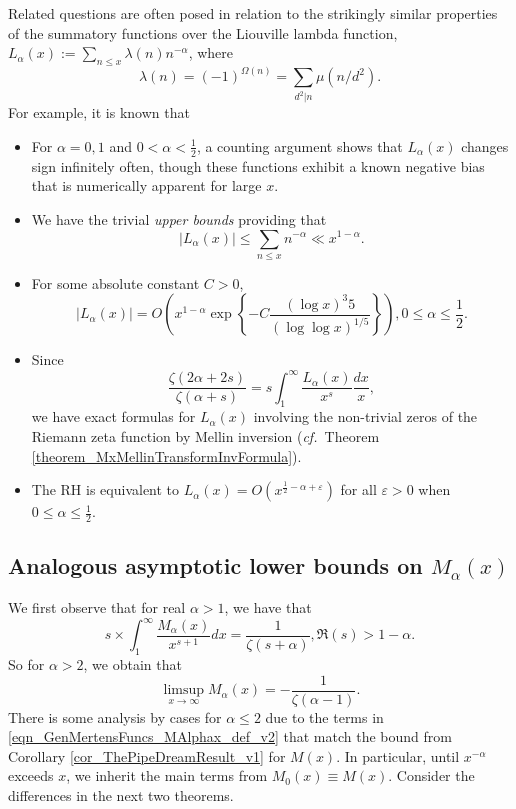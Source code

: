 \documentclass[11pt,reqno,a4letter]{article}
\numberwithin{figure}{section}
\numberwithin{table}{section}
\newcommand{\cf}{\textit{cf.\ }}
\newcommand{\floor}[1]{\left\lfloor #1 \right\rfloor}
\theoremstyle{plain}
\numberwithin{theorem}{section}
\theoremstyle{definition}
\begin{document}
Related questions are often posed in relation to the strikingly 
similar properties of the 
summatory functions over the Liouville lambda function, 
$L_{\alpha}(x) := \sum_{n \leq x} \lambda(n) n^{-\alpha}$, where 
$$\lambda(n) = (-1)^{\Omega(n)} = \sum_{d^2|n} \mu(n/d^2).$$  
For example, it is known that \cite{JNT-HUMPHRIES-2013} 
\begin{itemize} 
     \item For $\alpha = 0, 1$ and $0 < \alpha < \frac{1}{2}$, a counting argument shows that 
     $L_{\alpha}(x)$ changes sign infinitely often, though these functions exhibit a known 
     negative bias that is numerically apparent for large $x$. 
     \item We have the trivial \emph{upper bounds} providing that 
     \[
     |L_{\alpha}(x)| \leq \sum_{n \leq x} n^{-\alpha} \ll x^{1-\alpha}. 
     \]
     \item For some absolute constant $C > 0$, 
     \[
     |L_{\alpha}(x)| = O\left(x^{1-\alpha} \exp\left\{-C \frac{(\log x)^{3}{5}}{(\log\log x)^{1/5}} 
          \right\}\right), 0 \leq \alpha \leq \frac{1}{2}. 
     \]
     \item Since 
     \[
     \frac{\zeta(2\alpha+2s)}{\zeta(\alpha+s)} = s \int_1^{\infty} \frac{L_{\alpha}(x)}{x^s} \frac{dx}{x}, 
     \]
     we have exact formulas for $L_{\alpha}(x)$ involving the non-trivial zeros of the 
     Riemann zeta function by Mellin inversion (\cf Theorem \ref{theorem_MxMellinTransformInvFormula}).  
     \item The RH is equivalent to $L_{\alpha}(x) = O(x^{\frac{1}{2}-\alpha+\varepsilon})$ for all 
           $\varepsilon > 0$ when $0 \leq \alpha \leq \frac{1}{2}$. 
\end{itemize} 

\subsection{Analogous asymptotic lower bounds on $M_{\alpha}(x)$} 

We first observe that for real $\alpha > 1$, we have that 
\[
s \times \int_1^{\infty} \frac{M_{\alpha}(x)}{x^{s+1}} dx = \frac{1}{\zeta(s+\alpha)}, \Re(s) > 1-\alpha. 
\]
So for $\alpha > 2$, we obtain that 
\[
\limsup\limits_{x \rightarrow \infty} M_{\alpha}(x) = -\frac{1}{\zeta(\alpha-1)}. 
\]
There is some analysis by cases for $\alpha \leq 2$ due to the terms in 
\eqref{eqn_GenMertensFuncs_MAlphax_def_v2} that match the bound from 
Corollary \ref{cor_ThePipeDreamResult_v1} for $M(x)$. 
In particular, until $x^{-\alpha}$ exceeds $x$, we inherit the main terms from 
$M_0(x) \equiv M(x)$. Consider the differences in the next two theorems. 
\end{document}
